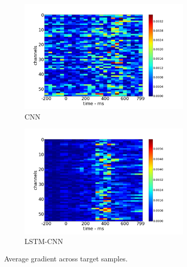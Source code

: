 \documentclass[
12pt, %
english, %
doublespacing, %
headsepline, %
]{MastersDoctoralThesis} %
\begin{document}
\vspace{0.5cm}

\begin{figure}
	\centering
	\begin{subfigure}{.5\textwidth}
		\centering
		\captionsetup{justification=raggedright,
			singlelinecheck=false,
			margin=9em
		}
		\includegraphics[width=0.9\textwidth]{cnn_sailency.png}
		\caption{CNN}
		\label{fig:CNNSaliencyMap2}
	\end{subfigure}\hspace*{-3em}
	\begin{subfigure}{.5\textwidth}
		\captionsetup{justification=raggedright,
			singlelinecheck=false,
			margin=7em
		}
		\centering
		\includegraphics[width=0.9\textwidth,left]{lstm_cnn_sailency.png}
		\centering
		\caption{LSTM-CNN}
		\label{fig:LSTMCNNSaliencyMap2}
	\end{subfigure}
	\caption{Average gradient across target samples.}
	\label{fig:t}
\end{figure}
\end{document}
